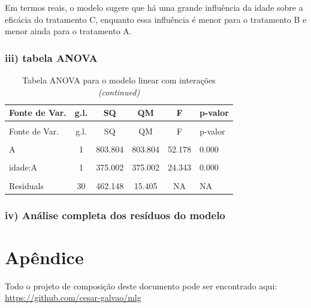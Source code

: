 \documentclass[
  letterpaper,
  DIV=11,
  numbers=noendperiod]{scrartcl}
\begin{document}
Em termos reais, o modelo sugere que há uma grande influência da idade
sobre a eficácia do tratamento C, enquanto essa influência é menor para
o tratamento B e menor ainda para o tratamento A.

\hypertarget{iii-tabela-anova}{%
\subsubsection{iii) tabela ANOVA}\label{iii-tabela-anova}}

\begin{longtable}[t]{lccccl}
\caption{Tabela ANOVA para o modelo linear com interações}\\
\toprule
Fonte de Var. & g.l. & SQ & QM & F & p-valor\\
\midrule
\endfirsthead
\caption[]{Tabela ANOVA para o modelo linear com interações \textit{(continued)}}\\
\toprule
Fonte de Var. & g.l. & SQ & QM & F & p-valor\\
\midrule
\endhead

\endfoot
\bottomrule
\endlastfoot
\cellcolor{gray!15}{idade} & \cellcolor{gray!15}{1} & \cellcolor{gray!15}{3424.432} & \cellcolor{gray!15}{3424.432} & \cellcolor{gray!15}{222.295} & \cellcolor{gray!15}{0.000}\\
A & 1 & 803.804 & 803.804 & 52.178 & 0.000\\
\cellcolor{gray!15}{B} & \cellcolor{gray!15}{1} & \cellcolor{gray!15}{1.189} & \cellcolor{gray!15}{1.189} & \cellcolor{gray!15}{0.077} & \cellcolor{gray!15}{0.783}\\
idade:A & 1 & 375.002 & 375.002 & 24.343 & 0.000\\
\cellcolor{gray!15}{idade:B} & \cellcolor{gray!15}{1} & \cellcolor{gray!15}{328.424} & \cellcolor{gray!15}{328.424} & \cellcolor{gray!15}{21.319} & \cellcolor{gray!15}{0.000}\\
Residuals & 30 & 462.148 & 15.405 & NA & NA\\*
\end{longtable}

\hypertarget{iv-anuxe1lise-completa-dos-resuxedduos-do-modelo}{%
\subsubsection{iv) Análise completa dos resíduos do
modelo}\label{iv-anuxe1lise-completa-dos-resuxedduos-do-modelo}}

\hypertarget{apuxeandice}{%
\section{Apêndice}\label{apuxeandice}}

Todo o projeto de composição deste documento pode ser encontrado aqui:
\url{https://github.com/cesar-galvao/mlg}
\end{document}

